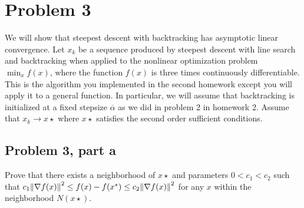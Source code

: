 \section{Problem 3}
\newcommand{\alphabar}{\overline{\alpha}}
We will show that steepest descent with backtracking has asymptotic linear convergence. Let $x_k$ be a sequence produced by steepest descent with line search and backtracking when applied to the nonlinear optimization problem $\min_{x} f(x)$, where the function $f(x)$ is three times continuously differentiable. This is the algorithm you implemented in the second homework except you will apply it to a general function. In particular, we will assume that backtracking is initialized at a fixed stepsize $\alphabar$ as we did in problem 2 in homework 2. Assume that $x_k \rightarrow x\star$ where $x\star$ satisfies the second order sufficient conditions. 

\subsection{Problem 3, part a}
Prove that there exists a neighborhood of $x\star$ and parameters $0 < c_1 < c_2$ such that $c_1 \norm{\nabla f(x)}^2 \leq f(x) - f(x^{*}) \leq c_2\norm{\nabla f(x)}^2$ for any $x$ within the neighborhood $N(x\star)$.
\partbreak


